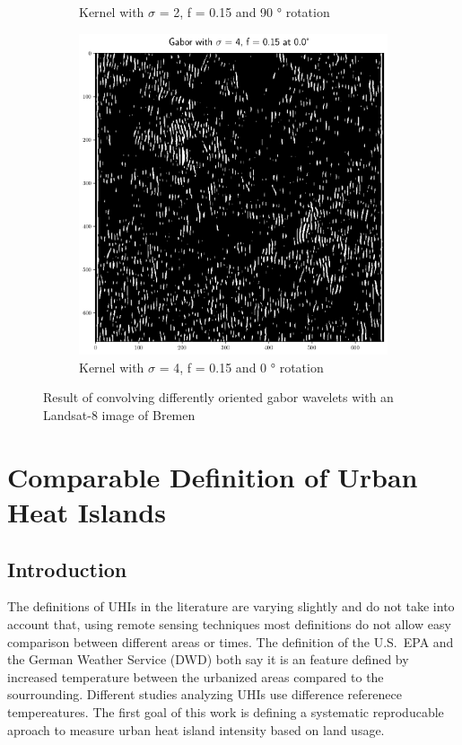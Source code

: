 \documentclass[a4paper, english]{article}
\begin{document}
\begin{figure}[!htbp]
\begin{subfigure}[b]{0.3\textwidth}
         \caption{Kernel with $\sigma$ = 2, f = 0.15 and 90 ° rotation}\label{fig:feat05}
     \end{subfigure}
     \hfill
     \begin{subfigure}[b]{0.3\textwidth}
         \centering
         \includegraphics[width=\textwidth]{img/Features_4_015_0.png}
         \caption{Kernel with $\sigma$ = 4, f = 0.15 and 0 ° rotation}\label{fig:feat06}
     \end{subfigure}
        \caption{Result of convolving differently oriented gabor wavelets with an Landsat-8 image of Bremen}\label{fig:gaborExample}
    \end{figure}




\section{Comparable Definition of Urban Heat Islands}
    \subsection{Introduction}
    The definitions of \glspl{UHI} in the literature are varying slightly and do not take into account that, using remote sensing techniques most definitions do not allow easy comparison between different areas or times.
    The definition of the U.S.~EPA\cite{EPA2008} and the German Weather Service (DWD) both say it is an feature defined by increased temperature between the urbanized areas compared to the sourrounding. %
    Different studies analyzing \glspl{UHI} use difference referenece tempereatures.
    The first goal of this work is defining a systematic reproducable aproach to measure urban heat island intensity based on land usage.
\end{document}
